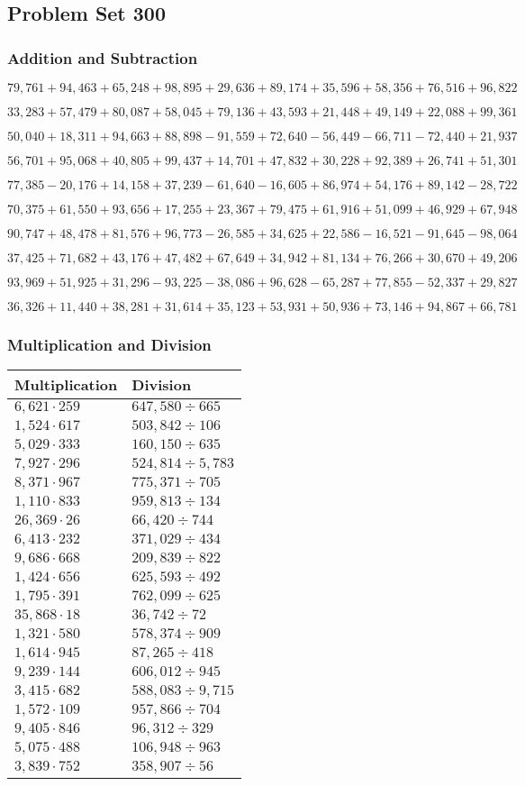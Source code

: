 \hypertarget{problem-set-300}{%
\subsection{Problem Set 300}\label{problem-set-300}}

\hypertarget{addition-and-subtraction}{%
\subsubsection{Addition and
Subtraction}\label{addition-and-subtraction}}

\(79,761+94,463+65,248+98,895+29,636+89,174+35,596+58,356+76,516+96,822\)

\(33,283+57,479+80,087+58,045+79,136+43,593+21,448+49,149+22,088+99,361\)

\(50,040+18,311+94,663+88,898-91,559+72,640-56,449-66,711-72,440+21,937\)

\(56,701+95,068+40,805+99,437+14,701+47,832+30,228+92,389+26,741+51,301\)

\(77,385-20,176+14,158+37,239-61,640-16,605+86,974+54,176+89,142-28,722\)

\(70,375+61,550+93,656+17,255+23,367+79,475+61,916+51,099+46,929+67,948\)

\(90,747+48,478+81,576+96,773-26,585+34,625+22,586-16,521-91,645-98,064\)

\(37,425+71,682+43,176+47,482+67,649+34,942+81,134+76,266+30,670+49,206\)

\(93,969+51,925+31,296-93,225-38,086+96,628-65,287+77,855-52,337+29,827\)

\(36,326+11,440+38,281+31,614+35,123+53,931+50,936+73,146+94,867+66,781\)

\hypertarget{multiplication-and-division}{%
\subsubsection{Multiplication and
Division}\label{multiplication-and-division}}

\begin{longtable}[]{@{}ll@{}}
\toprule
Multiplication & Division\tabularnewline
\midrule
\endhead
\(6,621\cdot259\) & \(647,580÷665\)\tabularnewline
\(1,524\cdot617\) & \(503,842÷106\)\tabularnewline
\(5,029\cdot333\) & \(160,150÷635\)\tabularnewline
\(7,927\cdot296\) & \(524,814÷5,783\)\tabularnewline
\(8,371\cdot967\) & \(775,371÷705\)\tabularnewline
\(1,110\cdot833\) & \(959,813÷134\)\tabularnewline
\(26,369\cdot26\) & \(66,420÷744\)\tabularnewline
\(6,413\cdot232\) & \(371,029÷434\)\tabularnewline
\(9,686\cdot668\) & \(209,839÷822\)\tabularnewline
\(1,424\cdot656\) & \(625,593÷492\)\tabularnewline
\(1,795\cdot391\) & \(762,099÷625\)\tabularnewline
\(35,868\cdot18\) & \(36,742÷72\)\tabularnewline
\(1,321\cdot580\) & \(578,374÷909\)\tabularnewline
\(1,614\cdot945\) & \(87,265÷418\)\tabularnewline
\(9,239\cdot144\) & \(606,012÷945\)\tabularnewline
\(3,415\cdot682\) & \(588,083÷9,715\)\tabularnewline
\(1,572\cdot109\) & \(957,866÷704\)\tabularnewline
\(9,405\cdot846\) & \(96,312÷329\)\tabularnewline
\(5,075\cdot488\) & \(106,948÷963\)\tabularnewline
\(3,839\cdot752\) & \(358,907÷56\)\tabularnewline
\bottomrule
\end{longtable}
